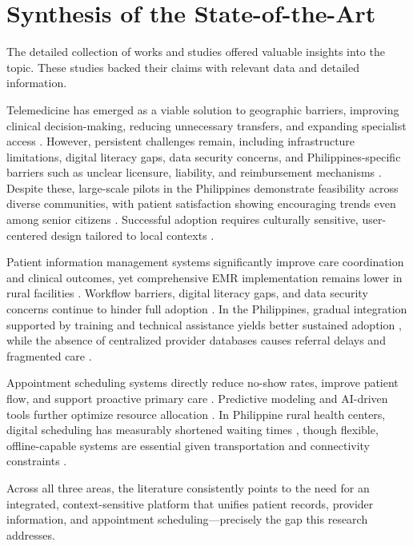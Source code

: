 \documentclass[12pt]{report}
\begin{document}
\section*{Synthesis of the State-of-the-Art}

The detailed collection of works and studies offered valuable insights into the
topic. These studies backed their claims with relevant data and detailed
information.

Telemedicine has emerged as a viable solution to geographic barriers, improving
clinical decision-making, reducing unnecessary transfers, and expanding
specialist access \cite{ref15, ref30, ref27}. However, persistent challenges
remain, including infrastructure limitations, digital literacy gaps, data
security concerns, and Philippines-specific barriers such as unclear licensure,
liability, and reimbursement mechanisms \cite{ref25, ref41, ref46, ref51}.
Despite these, large-scale pilots in the Philippines demonstrate feasibility
across diverse communities, with patient satisfaction showing encouraging
trends even among senior citizens \cite{ref7, ref32, ref39, ref59}. Successful
adoption requires culturally sensitive, user-centered design tailored to local
contexts \cite{ref49, ref63}.

Patient information management systems significantly improve care coordination
and clinical outcomes, yet comprehensive EMR implementation remains lower in
rural facilities \cite{ref6, ref12}. Workflow barriers, digital literacy gaps,
and data security concerns continue to hinder full adoption
\cite{ref1, ref3, ref38, ref41}. In the Philippines, gradual integration
supported by training and technical assistance yields better sustained adoption
\cite{ref28}, while the absence of centralized provider databases causes
referral delays and fragmented care \cite{ref53, ref60}.

Appointment scheduling systems directly reduce no-show rates, improve patient
flow, and support proactive primary care \cite{ref11, ref45, ref56}. Predictive
modeling and AI-driven tools further optimize resource allocation
\cite{ref17, ref13, ref56}. In Philippine rural health centers, digital
scheduling has measurably shortened waiting times \cite{ref50}, though
flexible, offline-capable systems are essential given transportation and
connectivity constraints \cite{ref37}.

Across all three areas, the literature consistently points to the need for an
integrated, context-sensitive platform that unifies patient records, provider
information, and appointment scheduling---precisely the gap this research
addresses.
\end{document}
